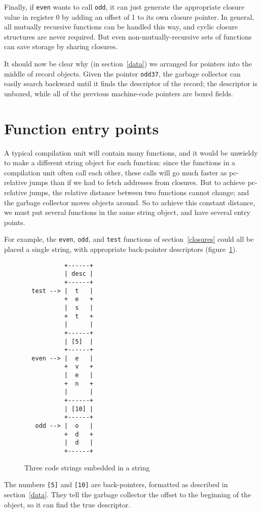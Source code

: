 Finally, if \verb"even" wants to call \verb"odd", it can just generate
the appropriate closure value in register 0 by adding an offset of 1
to its own closure pointer.  In general, all mutually recursive
functions can be handled this way, and cyclic
closure structures
are never required.  But even non-mutually-recursive sets of functions
can save storage by sharing closures.

It should now be clear why (in section~\ref{data}) we arranged for
pointers into the middle of record objects.  Given the pointer
\verb"odd37", the garbage collector can easily search backward until
it finds the descriptor
of the record; the descriptor is unboxed,
while all of the previous machine-code pointers are boxed fields.

\section{Function entry points}
\label{function}

A typical compilation unit
will contain many functions, and it would be
unwieldy to make a different string object for each function:
since the functions in a compilation unit often call each other,
these calls will go much faster as pc-relative jumps than if
we had to fetch addresses from closures.  But to achieve pc-relative
jumps, the relative distance between two functions cannot change;
and the garbage collector moves objects around.
So to achieve
this constant distance, we must put several functions in the
same string object, and have several
entry points.  

For example, the \verb"even", \verb"odd", and \verb"test"
functions of section~\ref{closures} could all be placed a single string,
with appropriate back-pointer descriptors (figure~\ref{embedded1}).
\begin{figure}[htbp]
\label{embedded1}
\begin{verbatim}
           +------+
           | desc |
           +------+
  test --> |  t   |
           +  e   +
           |  s   |
           +  t   +
           |      |
           +------+
           | [5]  |
           +------+
  even --> |  e   |
           +  v   +
           |  e   |
           +  n   +
           |      |
           +------+
           | [10] |
           +------+
   odd --> |  o   |
           +  d   +
           |  d   |
           +------+
\end{verbatim}
\caption{Three code strings embedded in a string}
\end{figure}
The numbers \verb"[5]" and \verb"[10]" are back-pointers, formatted
as described in section~\ref{data}.  They tell the garbage collector
the offset to the beginning of the object, so it can find the true descriptor.

